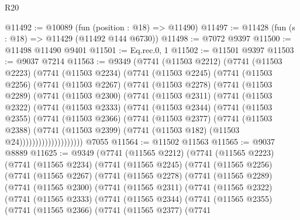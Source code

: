 \begin{lexlean}{R20}
\begin{coremodule}
{@11492 := @10089 (fun (position : @18) => @11490)
@11497 := @11428 (fun (s : @18) => @11429 (@11492 @144 @6730))
@11498 := @7072 @9397
@11500 := @11498 @11490 @9401
@11501 := Eq.rec.{0, 1}
@11502 := @11501 @9397
@11503 := @9037 @7214
@11563 := @9349
    (@7741
      (@11503 @2212)
      (@7741
        (@11503 @2223)
        (@7741
          (@11503 @2234)
          (@7741
            (@11503 @2245)
            (@7741
              (@11503 @2256)
              (@7741
                (@11503 @2267)
                (@7741
                  (@11503 @2278)
                  (@7741
                    (@11503 @2289)
                    (@7741
                      (@11503 @2300)
                      (@7741
                        (@11503 @2311)
                        (@7741
                          (@11503 @2322)
                          (@7741
                            (@11503 @2333)
                            (@7741
                              (@11503 @2344)
                              (@7741
                                (@11503 @2355)
                                (@7741
                                  (@11503 @2366)
                                  (@7741
                                    (@11503 @2377)
                                    (@7741
                                      (@11503 @2388)
                                      (@7741
                                        (@11503 @2399)
                                        (@7741 (@11503 @182) (@11503 @24))))))))))))))))))))
    @7055
@11564 := @11502 @11563
@11565 := @9037 @8889
@11625 := @9349
    (@7741
      (@11565 @2212)
      (@7741
        (@11565 @2223)
        (@7741
          (@11565 @2234)
          (@7741
            (@11565 @2245)
            (@7741
              (@11565 @2256)
              (@7741
                (@11565 @2267)
                (@7741
                  (@11565 @2278)
                  (@7741
                    (@11565 @2289)
                    (@7741
                      (@11565 @2300)
                      (@7741
                        (@11565 @2311)
                        (@7741
                          (@11565 @2322)
                          (@7741
                            (@11565 @2333)
                            (@7741
                              (@11565 @2344)
                              (@7741
                                (@11565 @2355)
                                (@7741
                                  (@11565 @2366)
                                  (@7741
                                    (@11565 @2377)
                                    (@7741
}
\end{coremodule}
\end{lexlean}
